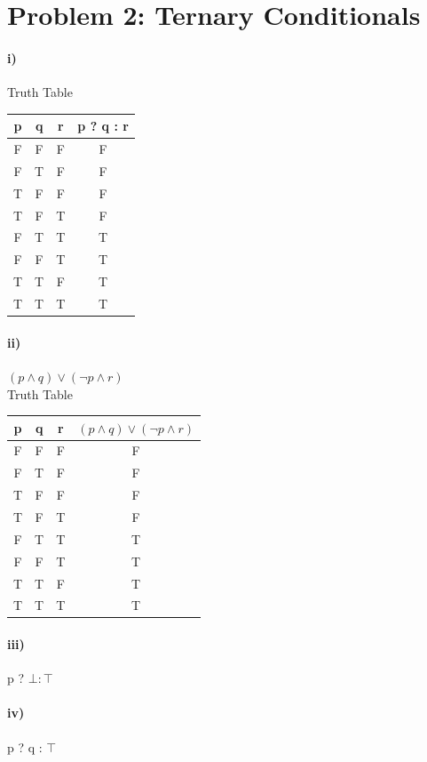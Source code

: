 \documentclass[10pt,letter]{article}
\begin{document}
\section*{Problem 2: Ternary Conditionals}
\paragraph{i)}
Truth Table \\
\newline
\begin{tabular}{ c | c | c | c }
  p & q & r &  {p ? q : r}\\
  \hline
  F & F & F & F \\
  F & T & F & F \\
  T & F & F & F \\
  T & F & T & F \\
  F & T & T & T \\
  F & F & T & T \\
  T & T & F & T \\
  T & T & T & T
\end{tabular}


\paragraph{ii)}
$ (p \wedge q) \vee (\neg p \wedge r)$ \\
  \newline
  Truth Table \\
  \newline
\begin{tabular}{ c | c | c | c }
  p & q & r &  {$ (p \wedge q) \vee (\neg p \wedge r)$}\\
  \hline
  F & F & F & F \\
  F & T & F & F \\
  T & F & F & F \\
  T & F & T & F \\
  F & T & T & T \\
  F & F & T & T \\
  T & T & F & T \\
  T & T & T & T
  
\end{tabular}
\paragraph{iii)}
 p ? $\bot : \top $

\paragraph{iv)}
 p ? q : $\top  $
\end{document}
